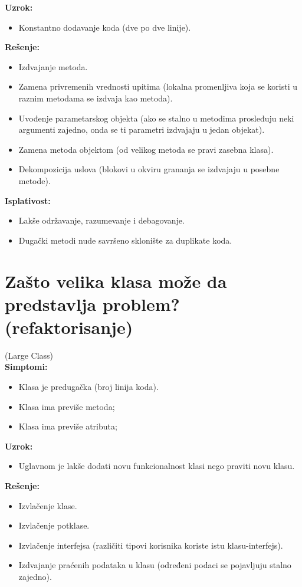 \documentclass[a4paper]{article}
\begin{document}
  \noindent \textbf{Uzrok:} 
  \begin{itemize}
    \item Konstantno dodavanje koda (dve po dve linije).
  \end{itemize}

  \noindent \textbf{Rešenje:} 
  \begin{itemize}
    \item Izdvajanje metoda.
    \item Zamena privremenih vrednosti upitima (lokalna promenljiva koja se koristi u
          raznim metodama se izdvaja kao metoda).
    \item Uvođenje parametarskog objekta (ako se stalno u metodima prosleđuju neki argumenti zajedno,
          onda se ti parametri izdvajaju u jedan objekat).
    \item Zamena metoda objektom (od velikog metoda se pravi zasebna klasa).
    \item Dekompozicija uslova (blokovi u okviru grananja se izdvajaju u posebne metode).
  \end{itemize}

  \noindent \textbf{Isplativost:} 
  \begin{itemize}
    \item Lakše održavanje, razumevanje i debagovanje.
    \item Dugački metodi nude savršeno sklonište za duplikate koda.
  \end{itemize}

\section{Zašto velika klasa može da predstavlja problem? (refaktorisanje)}
  (Large Class)\\
  \textbf{Simptomi:}
  \begin{itemize}
    \item Klasa je predugačka (broj linija koda).
    \item Klasa ima previše metoda;
    \item Klasa ima previše atributa;
  \end{itemize}

  \noindent \textbf{Uzrok:} 
  \begin{itemize}
    \item Uglavnom je lakše dodati novu funkcionalnost klasi nego praviti novu klasu.
  \end{itemize}

  \noindent \textbf{Rešenje:} 
  \begin{itemize}
    \item Izvlačenje klase.
    \item Izvlačenje potklase.
    \item Izvlačenje interfejsa (različiti tipovi korisnika koriste istu klasu-interfejs).
    \item Izdvajanje praćenih podataka u klasu (određeni podaci se pojavljuju stalno zajedno).
  \end{itemize}
\end{document}
